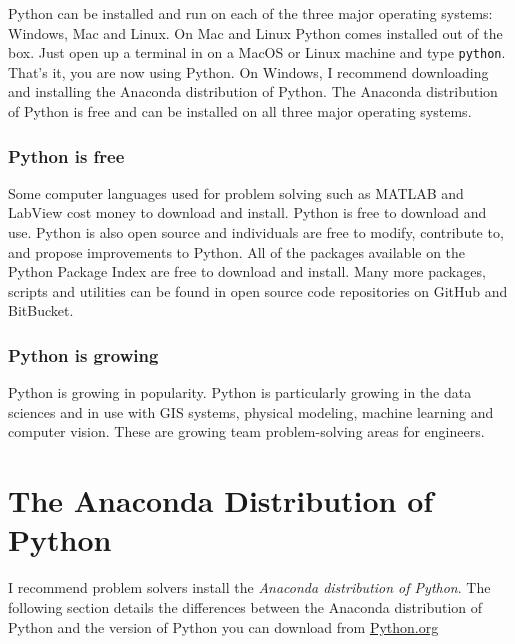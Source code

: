 \documentclass{book}
\newcommand{\passthrough}[1]{#1}
\begin{document}
Python can be installed and run on each of the three major operating
systems: Windows, Mac and Linux. On Mac and Linux Python comes installed
out of the box. Just open up a terminal in on a MacOS or Linux machine
and type \passthrough{\lstinline!python!}. That's it, you are now using
Python. On Windows, I recommend downloading and installing the Anaconda
distribution of Python. The Anaconda distribution of Python is free and
can be installed on all three major operating systems.

\hypertarget{python-is-free}{%
\subsubsection{Python is free}\label{python-is-free}}

Some computer languages used for problem solving such as MATLAB and
LabView cost money to download and install. Python is free to download
and use. Python is also open source and individuals are free to modify,
contribute to, and propose improvements to Python. All of the packages
available on the Python Package Index are free to download and install.
Many more packages, scripts and utilities can be found in open source
code repositories on GitHub and BitBucket.

\hypertarget{python-is-growing}{%
\subsubsection{Python is growing}\label{python-is-growing}}

Python is growing in popularity. Python is particularly growing in the
data sciences and in use with GIS systems, physical modeling, machine
learning and computer vision. These are growing team problem-solving
areas for engineers.
    




    
        \hypertarget{the-anaconda-distribution-of-python}{%
\section{The Anaconda Distribution of
Python}\label{the-anaconda-distribution-of-python}}
    




    
        I recommend problem solvers install the \emph{Anaconda distribution of
Python}. The following section details the differences between the
Anaconda distribution of Python and the version of Python you can
download from \href{https://python.org}{Python.org}
    
\end{document}
